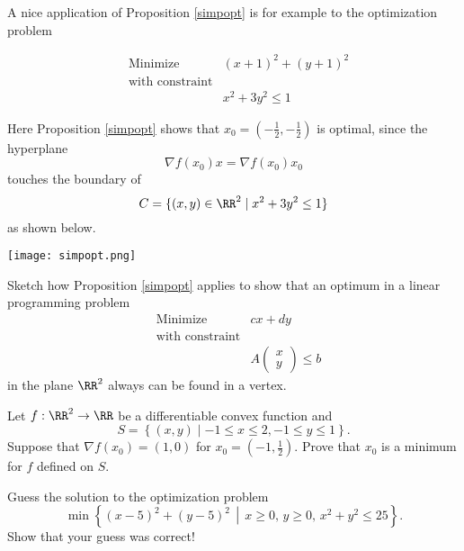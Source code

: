 \documentclass{article}
\begin{document}
\begin{example}

A nice application of Proposition \ref{simpopt} is for example to the optimization problem

\begin{align*}
    &\text{Minimize} &(x+1)^2 + (y+1)^2\\
    &\text{with constraint}\\
    &&x^2 + 3 y^2 \leq 1
\end{align*}

Here Proposition \ref{simpopt} shows that $x_0=\left(-\tfrac{1}{2}, -\tfrac{1}{2}\right)$ is optimal, since
the hyperplane
$$
\nabla f(x_0) x = \nabla f(x_0) x_0
$$
touches the boundary of
$$
C = \{(x, y)\in \RR^2\mid x^2 + 3y^2\leq 1\}
$$
as shown below.


\texttt{[image: simpopt.png]}



\end{example}


\newcommand{\Set}[2]{\left\{ #1 \middle| #2 \right\}}


\beginshex
Sketch how Proposition \ref{simpopt} applies to show that an optimum in a linear programming
problem
\begin{align*}
    &\text{Minimize} &c x + d y\\
    &\text{with constraint}\\
    &&A \begin{pmatrix} x \\ y \end{pmatrix} \leq b
  \end{align*}
in the plane $\RR^2$ always can be found in a vertex.
\endshex

\beginshex
  Let $f:\RR^2\rightarrow \RR$ be a differentiable convex function and
  \begin{equation*}
    S =\Set{ (x, y) }{ -1 \leq x \leq 2, -1 \leq y \leq 1 }.
  \end{equation*}
  Suppose that $\nabla f(x_0) = (1,0)$ for $x_0 =
  (-1,\frac{1}{2})$. Prove that $x_0$ is a minimum for $f$ defined on
  $S$.
\endshex

\beginshex
  Guess the solution to the optimization problem
  \begin{equation*}
    \min\Set{ (x-5)^2 + (y-5)^2\, }{ \, x\geq 0,\, y\geq 0,\, x^2 +
      y^2 \leq 25 }. 
  \end{equation*}
  Show that your guess was correct!
\endshex
\end{document}
